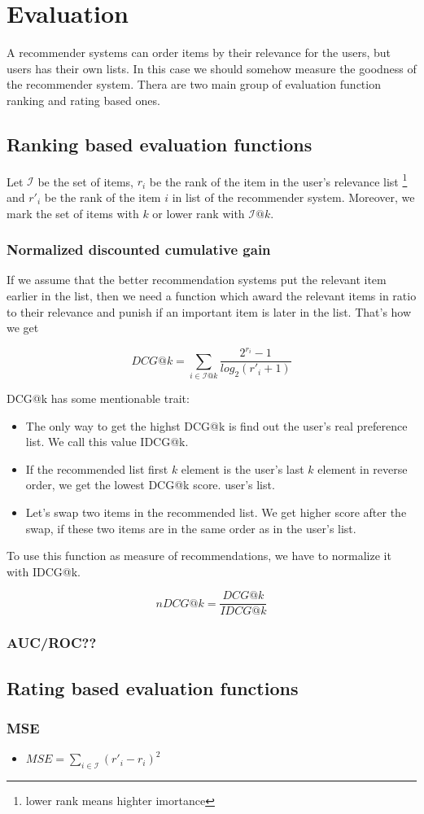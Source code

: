 \section{Evaluation}
A recommender systems can order items by their relevance for the users, but
users has their own lists. In this case we should somehow measure the goodness
of the recommender system. Thera are two main group of evaluation function
ranking and rating based ones.

\subsection{Ranking based evaluation functions}
Let $\mathcal{I}$ be the set of items, $r_i$ be the rank of the item in the
user's relevance list \footnote{lower rank means highter imortance}  and
$r'_i$ be the rank of the item $i$ in list of the recommender system.
Moreover, we mark the set of items with $k$ or lower rank with $\mathcal{I}@k$.

\subsubsection{Normalized discounted cumulative gain}
If we assume that the better recommendation systems put the relevant item
earlier in the list, then  we need a function which award the relevant items
in ratio to their relevance  and punish if an important item is later in the
list. That's how we get

$$ DCG@k=\sum_{i \in \mathcal{I}@k}\frac{2^{r_i}-1}{log_2(r'_i+1)} $$

DCG@k has some mentionable trait:
\begin{itemize}
\item The only way to get the highst DCG@k is find out the user's real preference
  list. We call this value IDCG@k.
\item If the recommended list first $k$ element is the user's last $k$ element in
  reverse order, we get the lowest DCG@k score.
  user's  list.
\item Let's swap two items in the recommended list. We get higher score after the
  swap, if these two items are in the same order as in the user's list.
\end{itemize}
To use this function as measure of recommendations, we have to normalize it with
IDCG@k.

$$nDCG@k=\frac{DCG@k}{IDCG@k}$$

\subsubsection{AUC/ROC??}

\subsection{Rating based evaluation functions}
\subsubsection{MSE}

\begin{itemize}
\item $MSE=\sum_{i\in\mathcal{I}} (r'_i - r_i)^2$ 

  
\end{itemize}
